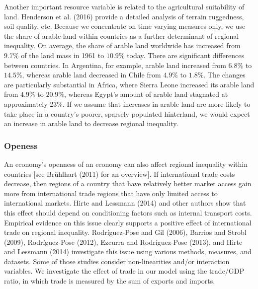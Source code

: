 \documentclass[10pt]{article}
\begin{document}
Another important resource variable is related to the agricultural suitability of land. Henderson et al. (2016) provide a detailed analysis of terrain ruggedness, soil quality, etc. Because we concentrate on time varying measures only, we use the share of arable land within countries as a further determinant of regional inequality. On average, the share of arable land worldwide has increased from $9.7 \%$ of the land mass in 1961 to $10.9 \%$ today. There are significant differences between countries. In Argentina, for example, arable land increased from 6.8\% to $14.5 \%$, whereas arable land decreased in Chile from $4.9 \%$ to $1.8 \%$. The changes are particularly substantial in Africa, where Sierra Leone increased its arable land from $4.9 \%$ to $20.9 \%$, whereas Egypt's amount of arable land stagnated at approximately 2$3 \%$. If we assume that increases in arable land are more likely to take place in a country's poorer, sparsely populated hinterland, we would expect an increase in arable land to decrease regional inequality.

\subsubsection{Openess}
An economy's openness of an economy can also affect regional inequality within countries [see Brühlhart (2011) for an overview]. If international trade costs decrease, then regions of a country that have relatively better market access gain more from international trade regions that have only limited access to international markets. Hirte and Lessmann (2014) and other authors show that this effect should depend on conditioning factors such as internal transport costs. Empirical evidence on this issue clearly supports a positive effect of international trade on regional inequality. Rodríguez-Pose and Gil (2006), Barrios and Strobl (2009), Rodríguez-Pose (2012), Ezcurra and Rodríguez-Pose (2013), and Hirte and Lessmann (2014) investigate this issue using various methods, measures, and datasets. Some of those studies consider non-linearities and/or interaction variables. We investigate the effect of trade in our model using the trade/GDP ratio, in which trade is measured by the sum of exports and imports.
\end{document}
